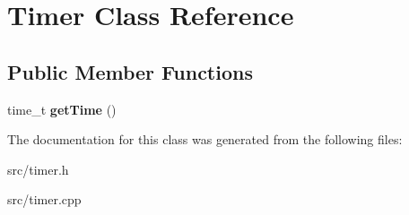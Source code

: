 \hypertarget{class_timer}{\section{Timer Class Reference}
\label{class_timer}
}
\subsection*{Public Member Functions}
\begin{DoxyCompactItemize}
\item 
\hypertarget{class_timer_af1871d84bbccf4e33a5ace242aba9cab}{time\-\_\-t {\bfseries get\-Time} ()}\label{class_timer_af1871d84bbccf4e33a5ace242aba9cab}

\end{DoxyCompactItemize}


The documentation for this class was generated from the following files\-:\begin{DoxyCompactItemize}
\item 
src/timer.\-h\item 
src/timer.\-cpp\end{DoxyCompactItemize}
